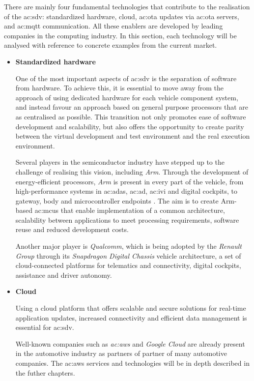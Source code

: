 There are mainly four fundamental technologies that contribute to the realisation of the \gls{ac:sdv}: standardized hardware, cloud, \gls{ac:ota} updates via \gls{ac:ota} servers, and \gls{ac:mqtt} communication. All these enablers are developed by leading companies in the computing industry. In this section, each technology will be analysed with reference to concrete examples from the current market.

\begin{itemize}
    \item[] \textbf{Standardized hardware} 
    
    One of the most important aspects of \gls{ac:sdv} is the separation of software from hardware. To achieve this, it is essential to move away from the approach of using dedicated hardware for each vehicle component system, and instead favour an approach based on general purpose processors that are as centralised as possible. This transition not only promotes ease of software development and scalability, but also offers the opportunity to create parity between the virtual development and test environment and the real execution environment.
    
    Several players in the semiconductor industry have stepped up to the challenge of realising this vision, including \textit{Arm}. Through the development of energy-efficient processors, \textit{Arm} is present in every part of the vehicle, from high-performance systems in \gls{ac:adas}, \gls{ac:ad}, \gls{ac:ivi} and digital cockpits, to gateway, body and microcontroller endpoints \cite{ArmAutomotive}. The aim is to create Arm-based \gls{ac:mcu}s that enable implementation of a common architecture, scalability between applications to meet processing requirements, software reuse and reduced development costs.
    
    Another major player is \textit{Qualcomm}, which is being adopted by the \textit{Renault Group} through its \textit{Snapdragon Digital Chassis} vehicle architecture, a set of cloud-connected platforms for telematics and connectivity, digital cockpits, assistance and driver autonomy.

    \item[] \textbf{Cloud} 
    
    Using a cloud platform that offers scalable and secure solutions for real-time application updates, increased connectivity and efficient data management is essential for \gls{ac:sdv}. 

    Well-known companies such as \textit{\gls{ac:aws}} and \textit{Google Cloud} are already present in the automotive industry as partners of partner of many automotive companies. The \gls{ac:aws} services and technologies will be in depth described in the futher chapters.
 

\end{itemize}
